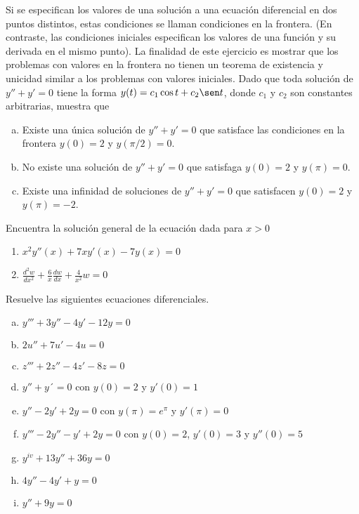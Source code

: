 \documentclass[12pt]{exam}
\begin{document}
\begin{questions}
     \question%
     Si se especifican los valores de una solución a una ecuación diferencial en dos puntos distintos, estas condiciones se llaman condiciones en la frontera. (En contraste, las condiciones iniciales especifican los valores de una función y su derivada en el mismo punto). La finalidad de este ejercicio es mostrar que los problemas con valores en la frontera no tienen un teorema de existencia y unicidad similar a los problemas con valores iniciales. Dado que toda solución de $y''+y'=0$ tiene la forma $y(t)=c_1\cos t+c_2\sen t$, donde $c_1$ y $c_2$ son constantes arbitrarias, muestra que
     \begin{enumerate}[a)]
         \item Existe una única solución de $y''+y'=0$ que satisface las condiciones en la frontera $y(0)=2$ y $y(\pi/2)=0$.
         \item No existe una solución de $y''+y'=0$ que satisfaga $y(0)=2$ y $y(\pi)=0$.
         \item Existe una infinidad de soluciones de $y''+y'=0$ que satisfacen $y(0)=2$ y $y(\pi)=-2$.
     \end{enumerate}


     \question%
     Encuentra la solución general de la ecuación dada para $x>0$
     \begin{enumerate}
         \item $x^2y''(x)+7xy'(x)-7y(x)=0$
         \item $\frac{d^2w}{dx^2}+\frac{6}{x}\frac{dw}{dx}+\frac{4}{x^2}w=0$
     \end{enumerate}
     

     
     
     \question%
     Resuelve las siguientes ecuaciones diferenciales.
     \begin{enumerate}[a)]
         \item $y'''+3y''-4y'-12y=0$
         \item $2u''+7u'-4u=0$
         \item $z'''+2z''-4z'-8z=0$
         \item $y''+y´=0$ con $y(0)=2$ y $y'(0)=1$
         \item $y''-2y'+2y=0$ con $y(\pi)=e^{\pi}$ y $y'(\pi)=0$
         \item $y'''-2y''-y'+2y=0$ con $y(0)=2$, $y'(0)=3$ y $y''(0)=5$
         \item $y^{iv}+13y''+36y=0$
         \item $4y''-4y'+y=0$
         \item $y''+9y=0$
     \end{enumerate}


\end{questions}
\end{document}
